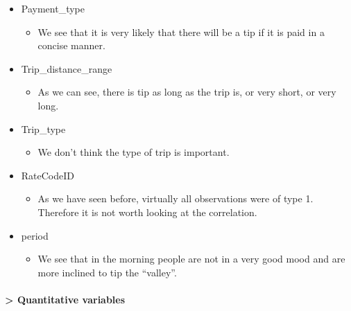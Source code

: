 \documentclass[
  18pt,
  a4paper]{article}
\newenvironment{Shaded}{\begin{snugshade}}{\end{snugshade}}
\newcommand{\NormalTok}[1]{#1}
\newcommand{\OperatorTok}[1]{\textcolor[rgb]{0.81,0.36,0.00}{\textbf{#1}}}
\providecommand{\tightlist}{%
  \setlength{\itemsep}{0pt}\setlength{\parskip}{0pt}}
\begin{document}
\begin{itemize}
\tightlist
\item
  Payment\_type

  \begin{itemize}
  \tightlist
  \item
    We see that it is very likely that there will be a tip if it is paid
    in a concise manner.
  \end{itemize}
\item
  Trip\_distance\_range

  \begin{itemize}
  \tightlist
  \item
    As we can see, there is tip as long as the trip is, or very short,
    or very long.
  \end{itemize}
\item
  Trip\_type

  \begin{itemize}
  \tightlist
  \item
    We don't think the type of trip is important.
  \end{itemize}
\item
  RateCodeID

  \begin{itemize}
  \tightlist
  \item
    As we have seen before, virtually all observations were of type 1.
    Therefore it is not worth looking at the correlation.
  \end{itemize}
\item
  period

  \begin{itemize}
  \tightlist
  \item
    We see that in the morning people are not in a very good mood and
    are more inclined to tip the ``valley''.
  \end{itemize}
\end{itemize}

\hypertarget{quantitative-variables-1}{%
\paragraph{\textgreater{} Quantitative
variables}\label{quantitative-variables-1}}

\begin{Shaded}
\end{Shaded}
\end{document}

